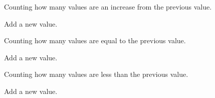 \documentclass[letterpaper,10pt,english]{sphinxmanual}
\begin{document}

\begin{fulllineitems}
\label{\detokenize{ref/LIS/core/FrameSet:TotalDepth.LIS.core.FrameSet.AccInc}}
Counting how many values are an increase from the previous value.

\begin{fulllineitems}
\label{\detokenize{ref/LIS/core/FrameSet:TotalDepth.LIS.core.FrameSet.AccInc.add}}
Add a new value.

\end{fulllineitems}


\end{fulllineitems}


\begin{fulllineitems}
\label{\detokenize{ref/LIS/core/FrameSet:TotalDepth.LIS.core.FrameSet.AccEq}}
Counting how many values are equal to the previous value.

\begin{fulllineitems}
\label{\detokenize{ref/LIS/core/FrameSet:TotalDepth.LIS.core.FrameSet.AccEq.add}}
Add a new value.

\end{fulllineitems}


\end{fulllineitems}


\begin{fulllineitems}
\label{\detokenize{ref/LIS/core/FrameSet:TotalDepth.LIS.core.FrameSet.AccDec}}
Counting how many values are less than the previous value.

\begin{fulllineitems}
\label{\detokenize{ref/LIS/core/FrameSet:TotalDepth.LIS.core.FrameSet.AccDec.add}}
Add a new value.

\end{fulllineitems}


\end{fulllineitems}
\end{document}
